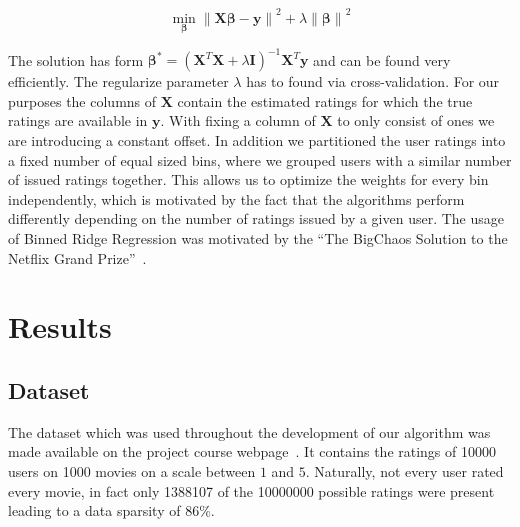 \documentclass[10pt,conference,compsocconf]{IEEEtran}
\newcommand{\norm}[1]{\left\lVert#1\right\rVert}
\begin{document}
\begin{equation}
  \min_{\bm \beta} \norm{\mathbf X \bm \beta - \mathbf y}^2 + \lambda
  \norm{\bm \beta}^2
\end{equation}

The solution has form $\bm \beta^* = {\left(\mathbf X^T \mathbf X + \lambda
    \mathbf I \right)}^{-1} \mathbf X^T \mathbf y$ and can be found very
efficiently. The regularize parameter $\lambda$ has to found via
cross-validation. For our purposes the columns of $\mathbf X$ contain the
estimated ratings for which the true ratings are available in $\mathbf y$. With
fixing a column of $\mathbf X$ to only consist of ones we are introducing a
constant offset. In addition we partitioned the user ratings into a fixed number
of equal sized bins, where we grouped users with a similar number of issued
ratings together. This allows us to optimize the weights for every bin
independently, which is motivated by the fact that the algorithms perform
differently depending on the number of ratings issued by a given user. The usage
of Binned Ridge Regression was motivated by the ``The BigChaos Solution to the
Netflix Grand Prize''~\cite{toescher2009bigchaos}.

\section{Results}
\label{sec:results}



\subsection{Dataset}
\label{sub:dataset}

The dataset which was used throughout the development of our algorithm was made
available on the project course webpage~\cite{lab2015collaborative}. It contains
the ratings of \num{10000} users on \num{1000} movies on a scale between $1$ and
$5$. Naturally, not every user rated every movie, in fact only \num{1388107} of
the \num{10000000} possible ratings were present leading to a data sparsity of
$86\%$.
\end{document}

